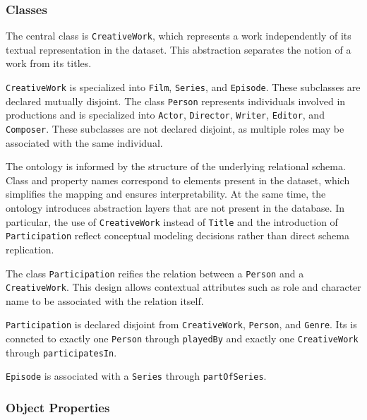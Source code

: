 \subsubsection{Classes}

The central class is \texttt{CreativeWork}, which represents a work independently of its textual representation in the dataset. This abstraction separates the notion of a work from its titles.

\texttt{CreativeWork} is specialized into \texttt{Film}, \texttt{Series}, and \texttt{Episode}. These subclasses are declared mutually disjoint. The class \texttt{Person} represents individuals involved in productions and is specialized into \texttt{Actor}, \texttt{Director}, \texttt{Writer}, \texttt{Editor}, and \texttt{Composer}. These subclasses are not declared disjoint, as multiple roles may be associated with the same individual.

The ontology is informed by the structure of the underlying relational schema. Class and property names correspond to elements present in the dataset, which simplifies the mapping and ensures interpretability. At the same time, the ontology introduces abstraction layers that are not present in the database. In particular, the use of \texttt{CreativeWork} instead of \texttt{Title} and the introduction of \texttt{Participation} reflect conceptual modeling decisions rather than direct schema replication.

The class \texttt{Participation} reifies the relation between a \texttt{Person} and a \texttt{CreativeWork}. This design allows contextual attributes such as role and character name to be associated with the relation itself.

\texttt{Participation} is declared disjoint from \texttt{CreativeWork}, \texttt{Person}, and \texttt{Genre}. Its is conncted to exactly one \texttt{Person} through \texttt{playedBy} and exactly one \texttt{CreativeWork} through \texttt{participatesIn}.

\texttt{Episode} is associated with a \texttt{Series} through \texttt{partOfSeries}.

\subsubsection{Object Properties}

